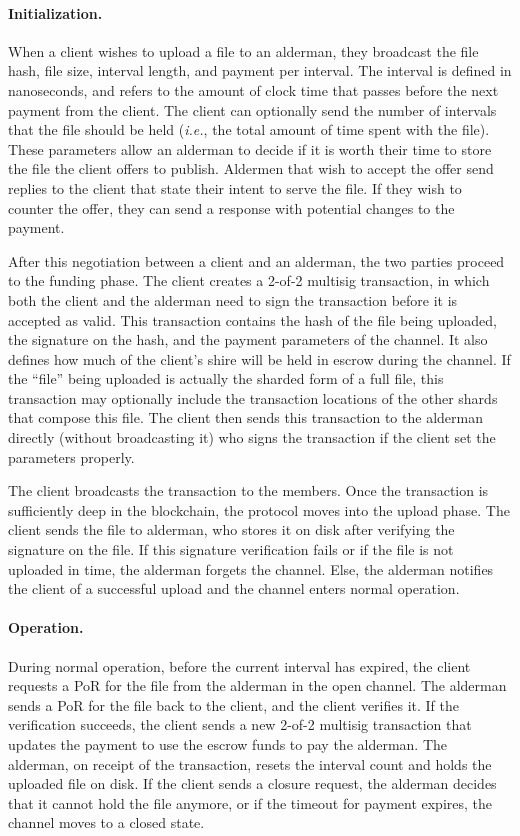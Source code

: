 \documentclass{article}
\begin{document}
\paragraph{Initialization.} When a client wishes to upload a file to an
alderman, they broadcast the file hash, file size, interval length, and payment
per interval. The interval is defined in nanoseconds, and refers to the amount
of clock time that passes before the next payment from the client. The client
can optionally send the number of intervals that the file should be held
(\emph{i.e.}, the total amount of time spent with the file). These parameters
allow an alderman to decide if it is worth their time to store the file the
client offers to publish. Aldermen that wish to accept the offer send replies to
the client that state their intent to serve the file. If they wish to counter
the offer, they can send a response with potential changes to the payment.

After this negotiation between a client and an alderman, the two parties proceed
to the funding phase. The client creates a 2-of-2 multisig transaction, in which
both the client and the alderman need to sign the transaction before it is
accepted as valid. This transaction contains the hash of the file being
uploaded, the signature on the hash, and the payment parameters of the channel.
It also defines how much of the client's shire will be held in escrow during the
channel. If the ``file'' being uploaded is actually the sharded form of a full
file, this transaction may optionally include the transaction locations of the
other shards that compose this file. The client then sends this transaction to
the alderman directly (without broadcasting it) who signs the transaction if the
client set the parameters properly.

The client broadcasts the transaction to the members. Once the transaction is
sufficiently deep in the blockchain, the protocol moves into the upload phase.
The client sends the file to alderman, who stores it on disk after verifying
the signature on the file. If this signature verification fails or if the file
is not uploaded in time, the alderman forgets the channel. Else, the alderman
notifies the client of a successful upload and the channel enters normal operation.

\paragraph{Operation.} During normal operation, before the current interval has
expired, the client requests a PoR for the file from the alderman in the open
channel. The alderman sends a PoR for the file back to the client, and the
client verifies it. If the verification succeeds, the client sends a new 2-of-2
multisig transaction that updates the payment to use the escrow funds to pay the
alderman. The alderman, on receipt of the transaction, resets the interval count
and holds the uploaded file on disk. If the client sends a closure request, the
alderman decides that it cannot hold the file anymore, or if the timeout for
payment expires, the channel moves to a closed state.
\end{document}
